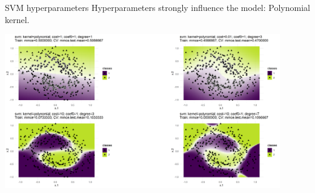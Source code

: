 \begin{vbframe}{SVM hyperparameters}
Hyperparameters strongly influence the model: Polynomial kernel.

\begin{center}
\includegraphics[width=0.9\textwidth]{figure/svm_poly_hyperparams.png}
\end{center}

\end{vbframe}


